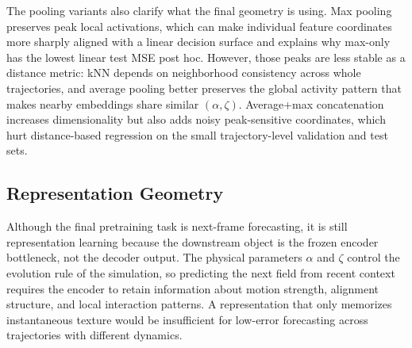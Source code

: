 \documentclass{article}
\begin{document}
\begin{table}[t]
\centering
\caption{Pooling ablation for the final frozen CNext-U-Net encoder. Values are normalized mean MSE; pooling is selected by validation performance.}
\label{tab:pooling_ablation}
\end{table}

The pooling variants also clarify what the final geometry is using. Max pooling preserves peak local activations, which can make individual feature coordinates more sharply aligned with a linear decision surface and explains why max-only has the lowest linear test MSE post hoc. However, those peaks are less stable as a distance metric: kNN depends on neighborhood consistency across whole trajectories, and average pooling better preserves the global activity pattern that makes nearby embeddings share similar $(\alpha,\zeta)$. Average+max concatenation increases dimensionality but also adds noisy peak-sensitive coordinates, which hurt distance-based regression on the small trajectory-level validation and test sets.

\subsection{Representation Geometry}

Although the final pretraining task is next-frame forecasting, it is still representation learning because the downstream object is the frozen encoder bottleneck, not the decoder output. The physical parameters $\alpha$ and $\zeta$ control the evolution rule of the simulation, so predicting the next field from recent context requires the encoder to retain information about motion strength, alignment structure, and local interaction patterns. A representation that only memorizes instantaneous texture would be insufficient for low-error forecasting across trajectories with different dynamics.
\end{document}
